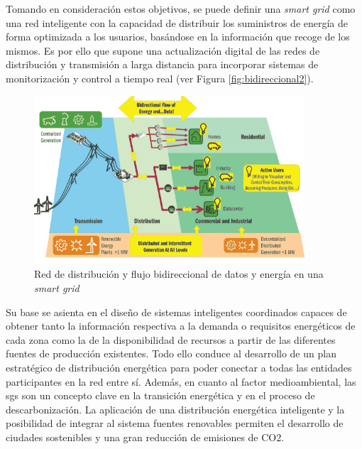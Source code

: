 \vspace{1mm}

Tomando en consideración estos objetivos, se puede definir una \textit{smart grid} como una red inteligente con la capacidad de distribuir los suministros de energía de forma optimizada a los usuarios, basándose en la información que recoge de los mismos. Es por ello que supone una actualización digital de las redes de distribución y transmisión a larga distancia para incorporar sistemas de monitorización y control a tiempo real (ver Figura \ref{fig:bidireccional2}). \cite{iotfutura} 

\vspace{3mm}

\begin{figure}[H]
  \centering
  \includegraphics[width=0.9\textwidth]{img/teoria/sg.png}
  \caption{Red de distribución y flujo bidireccional de datos y energía en una \textit{smart grid} \cite{sins}}
  \label{fig:bidireccional}
\end{figure}

\vspace{3mm}

Su base se asienta en el diseño de sistemas inteligentes coordinados capaces de obtener tanto la información respectiva a la demanda o requisitos energéticos de cada zona como la de la disponibilidad de recursos a partir de las diferentes fuentes de producción existentes. Todo ello conduce al desarrollo de un plan estratégico de distribución energética para poder conectar a todas las entidades participantes en la red entre sí. Además, en cuanto al factor medioambiental, las \gls{sg}s son un concepto clave en la transición energética y en el proceso de descarbonización. La aplicación de una distribución energética inteligente y la posibilidad de integrar al sistema fuentes renovables permiten el desarrollo de ciudades sostenibles y una gran reducción de emisiones de CO2. \cite{repsol} \cite{iberdrola}


